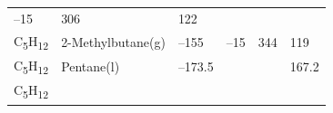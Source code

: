 \documentclass[
]{book}
\theoremstyle{definition}
\theoremstyle{definition}
\theoremstyle{definition}
\theoremstyle{remark}
\begin{document}
\begin{longtable}[]{@{}llllll@{}}
\begin{minipage}[t]{0.15\columnwidth}
--15\strut
\end{minipage} & \begin{minipage}[t]{0.14\columnwidth}\raggedright
306\strut
\end{minipage} & \begin{minipage}[t]{0.14\columnwidth}\raggedright
122\strut
\end{minipage}\tabularnewline
\begin{minipage}[t]{0.07\columnwidth}\raggedright
C\textsubscript{5}H\textsubscript{12}\strut
\end{minipage} & \begin{minipage}[t]{0.17\columnwidth}\raggedright
2-Methylbutane(g)\strut
\end{minipage} & \begin{minipage}[t]{0.15\columnwidth}\raggedright
--155\strut
\end{minipage} & \begin{minipage}[t]{0.15\columnwidth}\raggedright
--15\strut
\end{minipage} & \begin{minipage}[t]{0.14\columnwidth}\raggedright
344\strut
\end{minipage} & \begin{minipage}[t]{0.14\columnwidth}\raggedright
119\strut
\end{minipage}\tabularnewline
\begin{minipage}[t]{0.07\columnwidth}\raggedright
C\textsubscript{5}H\textsubscript{12}\strut
\end{minipage} & \begin{minipage}[t]{0.17\columnwidth}\raggedright
Pentane(l)\strut
\end{minipage} & \begin{minipage}[t]{0.15\columnwidth}\raggedright
--173.5\strut
\end{minipage} & \begin{minipage}[t]{0.15\columnwidth}\raggedright
\strut
\end{minipage} & \begin{minipage}[t]{0.14\columnwidth}\raggedright
\strut
\end{minipage} & \begin{minipage}[t]{0.14\columnwidth}\raggedright
167.2\strut
\end{minipage}\tabularnewline
\begin{minipage}[t]{0.07\columnwidth}\raggedright
C\textsubscript{5}H\textsubscript{12}\strut
\end{minipage} & \begin{minipage}[t]{0.17\columnwidth}\raggedright

\end{minipage}
\end{longtable}
\end{document}
